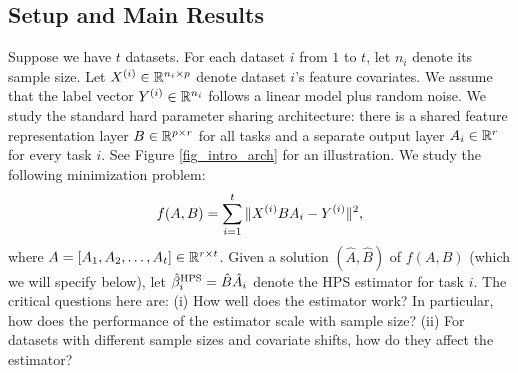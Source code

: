 \subsection{Setup and Main Results}

Suppose we have $t$ datasets.
For each dataset $i$ from $1$ to $t$, let $n_i$ denote its sample size.
Let $X^{(i)} \in \mathbb{R}^{n_i \times p}$ denote dataset $i$'s feature covariates.
We assume that the label vector $Y^{(i)} \in \mathbb{R}^{n_i}$ follows a linear model plus random noise.
We study the standard hard parameter sharing architecture:
there is a shared feature representation layer $B\in\mathbb{R}^{p\times r}$ for all tasks and a separate output layer $A_i \in \mathbb{R}^r$ for every task $i$.
See Figure \ref{fig_intro_arch} for an illustration.
We study the following minimization problem:
\begin{align}\label{eq_mtl}
			f(A, B) = \sum_{i=1}^t \|X^{(i)} B A_i - Y^{(i)}\|^2,
\end{align}
where $A = [A_1, A_2, \dots, A_t] \in \mathbb{R}^{r \times t}$.
Given a solution $(\hat{A}, \hat{B})$ of $f(A, B)$ (which we will specify below), let $\hat{\beta}_i^{\textup{HPS}} = \hat{B} \hat{A}_i$ denote the HPS estimator for task $i$.
The critical questions here are:
(i) How well does the estimator work? In particular, how does the performance of the estimator scale with sample size?
(ii) For datasets with different sample sizes and covariate shifts, how do they affect the estimator?


